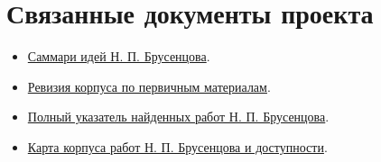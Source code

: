 \documentclass[12pt,a4paper]{article}
\begin{document}
\section{Связанные документы проекта}

\begin{itemize}
\item \href{../docs/Саммари-идей-Брусенцова.tex}{Саммари идей Н. П. Брусенцова}.
\item \href{Ревизия-корпуса-Брусенцова.tex}{Ревизия корпуса по первичным материалам}.
\item \href{Полный-указатель-трудов-Брусенцова.md}{Полный указатель найденных работ Н. П. Брусенцова}.
\item \href{Карта-работ-Брусенцова.tex}{Карта корпуса работ Н. П. Брусенцова и доступности}.
\end{itemize}
\end{document}
